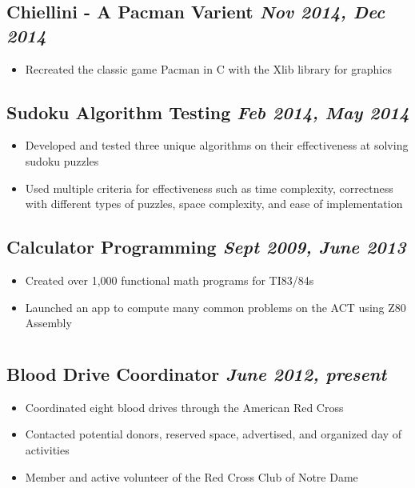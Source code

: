 \documentclass[10pt]{article}
\begin{document}
\begin{minipage}[t]{0.57\textwidth}
		\subsection*{Chiellini - A Pacman Varient \hfill \small\emph{Nov 2014, Dec 2014}}
		\begin{itemize}[noitemsep,nolistsep]
			\item Recreated the classic game Pacman in C with the Xlib library for graphics
		\end{itemize}

		\subsection*{Sudoku Algorithm Testing \hfill \small\emph{Feb 2014, May 2014}}
		\begin{itemize}[noitemsep,nolistsep]
			\item Developed and tested three unique algorithms on their effectiveness at solving sudoku puzzles
			\item Used multiple criteria for effectiveness such as time complexity, correctness with different types of puzzles, space complexity, and ease of implementation
		\end{itemize}

		\subsection*{Calculator Programming \hfill \small\emph{Sept 2009, June 2013}}
		\begin{itemize}[noitemsep,nolistsep]
			\item Created over 1,000 functional math programs for TI83/84s
			\item Launched an app to compute many common problems on the ACT using Z80 Assembly
		\end{itemize}

	\section*{}
		\subsection*{Blood Drive Coordinator \hfill \small\emph{June 2012, present}}
		\begin{itemize}[noitemsep,nolistsep]
			\item Coordinated eight blood drives through the American Red Cross
			\item Contacted potential donors, reserved space, advertised, and organized day of activities
			\item Member and active volunteer of the Red Cross Club of Notre Dame
		\end{itemize}
		

\end{minipage}
\end{document}
